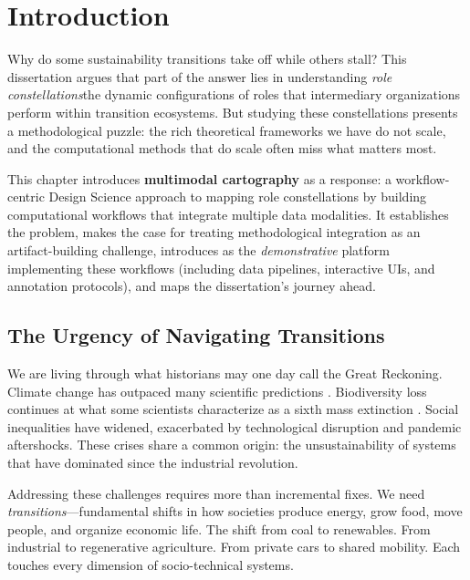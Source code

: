 \documentclass[../main.tex]{subfiles}
\begin{document}
\chapter{Introduction}
\margintoc

\begin{chapteroverview}
Why do some sustainability transitions take off while others stall? This dissertation argues that part of the answer lies in understanding \emph{role constellations}\textemdash the dynamic configurations of roles that intermediary organizations perform within transition ecosystems. But studying these constellations presents a methodological puzzle: the rich theoretical frameworks we have do not scale, and the computational methods that do scale often miss what matters most.

This chapter introduces \textbf{multimodal cartography} as a response: a workflow-centric Design Science approach to mapping role constellations by building computational workflows that integrate multiple data modalities. It establishes the problem, makes the case for treating methodological integration as an artifact-building challenge, introduces \RoleBox{} as the \emph{demonstrative} platform implementing these workflows (including data pipelines, interactive UIs, and annotation protocols), and maps the dissertation's journey ahead.
\end{chapteroverview}


\section{The Urgency of Navigating Transitions}
\label{sec:intro:urgency}

We are living through what historians may one day call the Great Reckoning. Climate change has outpaced many scientific predictions \cite{ipcc2023ar6}. Biodiversity loss continues at what some scientists characterize as a sixth mass extinction \cite{ipbes2019global}. Social inequalities have widened, exacerbated by technological disruption and pandemic aftershocks. These crises share a common origin: the unsustainability of systems that have dominated since the industrial revolution.

Addressing these challenges requires more than incremental fixes. We need \emph{transitions}---fundamental shifts in how societies produce energy, grow food, move people, and organize economic life. The shift from coal to renewables. From industrial to regenerative agriculture. From private cars to shared mobility. Each touches every dimension of socio-technical systems.
\end{document}
